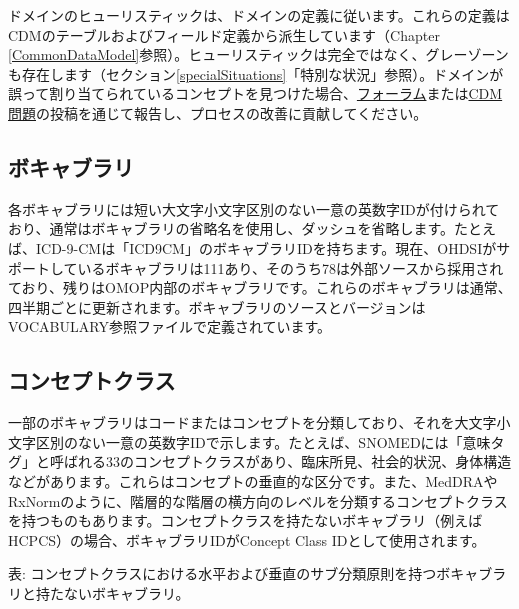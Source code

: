 \documentclass[
  11pt]{book}
\theoremstyle{definition}
\theoremstyle{definition}
\theoremstyle{definition}
\theoremstyle{definition}
\theoremstyle{remark}
\begin{document}
ドメインのヒューリスティックは、ドメインの定義に従います。これらの定義はCDMのテーブルおよびフィールド定義から派生しています（Chapter \ref{CommonDataModel}参照）。ヒューリスティックは完全ではなく、グレーゾーンも存在します（セクション\ref{specialSituations}「特別な状況」参照）。ドメインが誤って割り当てられているコンセプトを見つけた場合、\href{https://forums.ohdsi.org}{フォーラム}または\href{https://github.com/OHDSI/CommonDataModel/issues}{CDM問題}の投稿を通じて報告し、プロセスの改善に貢献してください。

\subsection{ボキャブラリ}\label{ux30dcux30adux30e3ux30d6ux30e9ux30ea}

各ボキャブラリには短い大文字小文字区別のない一意の英数字IDが付けられており、通常はボキャブラリの省略名を使用し、ダッシュを省略します。たとえば、ICD-9-CMは「ICD9CM」のボキャブラリIDを持ちます。現在、OHDSIがサポートしているボキャブラリは111あり、そのうち78は外部ソースから採用されており、残りはOMOP内部のボキャブラリです。これらのボキャブラリは通常、四半期ごとに更新されます。ボキャブラリのソースとバージョンはVOCABULARY参照ファイルで定義されています。 

\subsection{コンセプトクラス}\label{ux30b3ux30f3ux30bbux30d7ux30c8ux30afux30e9ux30b9}

一部のボキャブラリはコードまたはコンセプトを分類しており、それを大文字小文字区別のない一意の英数字IDで示します。たとえば、SNOMEDには「意味タグ」と呼ばれる33のコンセプトクラスがあり、臨床所見、社会的状況、身体構造などがあります。これらはコンセプトの垂直的な区分です。また、MedDRAやRxNormのように、階層的な階層の横方向のレベルを分類するコンセプトクラスを持つものもあります。コンセプトクラスを持たないボキャブラリ（例えばHCPCS）の場合、ボキャブラリIDがConcept Class IDとして使用されます。 

表: \label{tab:sublassification} コンセプトクラスにおける水平および垂直のサブ分類原則を持つボキャブラリと持たないボキャブラリ。
\end{document}
